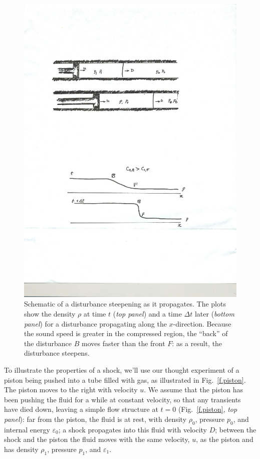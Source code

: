 \begin{figure}[htbp]
\includegraphics[width=\textwidth]{Figures/shock-formation}
\caption{Schematic of a disturbance steepening as it propagates.  The plots show the density $\rho$ at time $t$ (\emph{top panel}) and a time $\Delta t$ later (\emph{bottom panel}) for a disturbance propagating along the $x$-direction.  Because the sound speed is greater in the compressed region, the ``back'' of the disturbance $B$ moves faster than the front $F$: as a result, the disturbance steepens. }
\label{f.steepening}
\end{figure}

To illustrate the properties of a shock, we'll use our thought experiment of a piston being pushed into a tube filled with gas, as illustrated in Fig.~\ref{f.piston}.  The piston moves to the right with velocity $u$.  We assume that the piston has been pushing the fluid for a while at constant velocity, so that any transients have died down, leaving a simple flow structure at $t=0$ (Fig.~\ref{f.piston}, \emph{top panel}): far from the piston, the fluid is at rest, with density $\rho_{0}$, pressure $p_{0}$, and internal energy $\varepsilon_{0}$; a shock propagates into this fluid with velocity $D$; between the shock and the piston the fluid moves with the same velocity, $u$, as the piston and has density $\rho_{1}$, pressure $p_{1}$, and $\varepsilon_{1}$.

